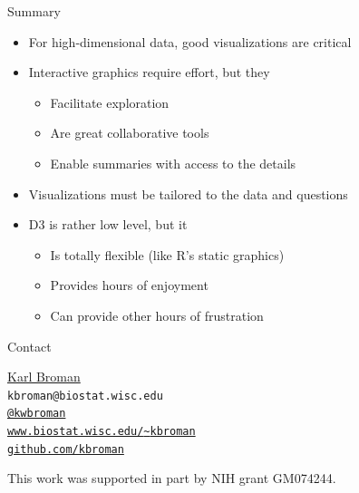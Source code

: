 \documentclass[final,plain]{beamer}
\newlength{\sepwid}
\newlength{\onecolwid}
\newcommand{\bi}{\begin{itemize}}
\newcommand{\ei}{\end{itemize}}
\newcommand{\coltwovsep}{\vspace{23mm}}
\begin{document}
\begin{frame}[t]
\begin{columns}[t]
\begin{column}{\onecolwid}
    \begin{exampleblock}{\Large Summary}
        \bi \itemsep18pt
        \item For high-dimensional data, good visualizations are
          {\color{mypurple} critical}
        \item {\color{mypurple} Interactive} graphics require effort, but they
          \bi
          \item Facilitate exploration
          \item Are great collaborative tools
          \item Enable summaries with access to the details
          \ei
        \item Visualizations must be {\color{mypurple} tailored} to
          the data and questions
        \item {\color{mypurple} D3} is rather low level, but it
          \bi
          \item Is totally flexible (like R's static graphics)
          \item Provides hours of enjoyment
          \item Can provide other hours of frustration
          \ei
        \ei
    \end{exampleblock}

  \coltwovsep %

    \begin{block}{Contact}
      \hspace{5em}
        \begin{minipage}{22em}
        \href{http://www.biostat.wisc.edu/~kbroman}{Karl Broman}\\
        {\tt kbroman@biostat.wisc.edu}\\
        \href{http://twitter.com/kwbroman}{\tt @kwbroman} \\
        \href{http://www.biostat.wisc.edu/~kbroman}{\tt www.biostat.wisc.edu/{\textasciitilde}kbroman} \\
        \href{http://github.com/kbroman}{\tt github.com/kbroman}
        \end{minipage}

    \vspace{60pt}
    {\rmfamily \footnotesize
    \centerline{This work was supported in part by NIH grant GM074244.}}
    \end{block}

  \end{column}

\begin{column}{\sepwid} \end{column}                 %


\end{columns}
\end{frame}
\end{document}
